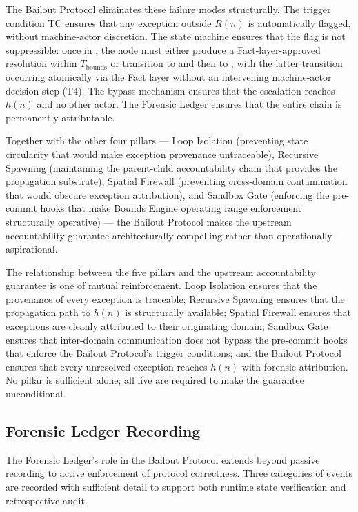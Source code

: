 The Bailout Protocol eliminates these failure modes structurally.  The trigger
condition TC ensures that any exception outside $R(n)$ is automatically flagged,
without machine-actor discretion.  The state machine ensures that the flag is
not suppressible: once in , the node must either produce a
Fact-layer-approved resolution within $T_{\text{bounds}}$ or transition to
 and then to , with the latter transition
occurring atomically via the Fact layer without an intervening machine-actor
decision step (T4).  The bypass mechanism ensures that the escalation reaches
$h(n)$ and no other actor.  The Forensic Ledger ensures that the entire chain
is permanently attributable.

Together with the other four pillars — Loop Isolation (preventing state
circularity that would make exception provenance untraceable), Recursive Spawning
(maintaining the parent-child accountability chain that provides the propagation
substrate), Spatial Firewall (preventing cross-domain contamination that would
obscure exception attribution), and Sandbox Gate (enforcing the pre-commit hooks
that make Bounds Engine operating range enforcement structurally operative) —
the Bailout Protocol makes the upstream accountability guarantee architecturally
compelling rather than operationally aspirational.

The relationship between the five pillars and the upstream accountability
guarantee is one of mutual reinforcement.  Loop Isolation ensures that the
provenance of every exception is traceable; Recursive Spawning ensures that
the propagation path to $h(n)$ is structurally available; Spatial Firewall
ensures that exceptions are cleanly attributed to their originating domain;
Sandbox Gate ensures that inter-domain communication does not bypass the
pre-commit hooks that enforce the Bailout Protocol's trigger conditions; and
the Bailout Protocol ensures that every unresolved exception reaches $h(n)$
with forensic attribution.  No pillar is sufficient alone; all five are required
to make the guarantee unconditional.

\subsection{Forensic Ledger Recording}\label{sec:forensic-recording}

The Forensic Ledger's role in the Bailout Protocol extends beyond passive
recording to active enforcement of protocol correctness.  Three categories of
events are recorded with sufficient detail to support both runtime state
verification and retrospective audit.

